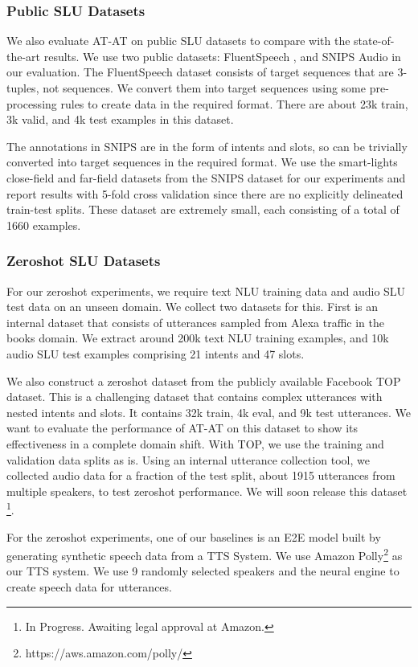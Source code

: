 \documentclass[letterpaper]{article} \usepackage{aaai21}  \usepackage{times}  \usepackage{helvet} \usepackage{courier}  \usepackage[hyphens]{url}  \usepackage{graphicx} \usepackage{booktabs}
\begin{document}
\subsubsection{Public SLU Datasets}
We also evaluate AT-AT on public SLU datasets to compare with the state-of-the-art results. We use two public datasets: FluentSpeech \cite{Lugosch2019SpeechMP}, and SNIPS Audio \cite{Saade2018SpokenLU} in our evaluation. The FluentSpeech dataset consists of target sequences that are 3-tuples, not sequences. We convert them into target sequences using some pre-processing rules to create data in the required format. 
There are about 23k train, 3k valid, and 4k test examples in this dataset.

The annotations in SNIPS are in the form of intents and slots, so can be trivially converted into target sequences in the required format. We use the smart-lights close-field and far-field datasets from the SNIPS dataset for our experiments and report results with 5-fold cross validation since there are no explicitly delineated train-test splits. These dataset are extremely small, each consisting of a total of 1660 examples.

\subsubsection{Zeroshot SLU Datasets}
For our zeroshot experiments, we require text NLU training data and audio SLU test data on an unseen domain. We collect two datasets for this. First is an internal dataset that consists of utterances sampled from Alexa traffic in the books domain. We extract around 200k text NLU training examples, and 10k audio SLU test examples comprising 21 intents and 47 slots. 

We also construct a zeroshot dataset from the publicly available Facebook TOP \cite{gupta2018semantic} dataset. This is a challenging dataset that contains complex utterances with nested intents and slots. It contains 32k train, 4k eval, and 9k test utterances. We want to evaluate the performance of AT-AT on this dataset to show its effectiveness in a complete domain shift. With TOP, we use the training and validation data splits as is. Using an internal utterance collection tool, we collected audio data for a fraction of the test split, about 1915 utterances from multiple speakers, to test zeroshot performance. We will soon release this dataset \footnote{In Progress. Awaiting legal approval at Amazon.}. 

For the zeroshot experiments, one of our baselines is an E2E model built by generating synthetic speech data from a TTS System. We use Amazon Polly\footnote{https://aws.amazon.com/polly/} as our TTS system. We use 9 randomly selected speakers and the neural engine to create speech data for utterances.
\end{document}
